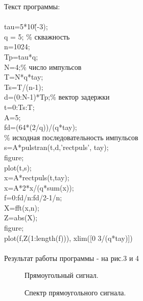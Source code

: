 \documentclass[12pt,a4paper]{report}
\begin{document}
Текст программы:\\
\\
tau=5*10\^(-3); \\
q = 5; \% скважность\\
n=1024;\\
Tp=tau*q;\\
N=4;\% число импульсов\\
T=N*q*tay; \\
Ts=T/(n-1);\\
d=(0:N-1)*Tp;\% вектор задержки \\
t=0:Ts:T; \\
A=5;\\
fd=(64*(2/q))/(q*tay);\\
\% исходная последовательность импульсов\\
s=A*pulstran(t,d,'rectpuls', tay);\\
figure;\\
plot(t,s);\\
x=A*rectpuls(t,tay);\\
x=A*2*x/(q*sum(x));\\
f=0:fd/n:fd/2-1/n;\\
X=fft(x,n);\\
Z=abs(X);\\
figure;\\
plot(f,Z(1:length(f))), xlim([0 3/(q*tay)])\\
\\
Результат работы программы - на рис.3 и 4\\
\newpage
\begin{figure}[h!]
\caption{Прямоугольный сигнал.}
\end{figure}
\begin{figure}[h!]
\caption{Спектр прямоугольного сигнала.}
\end{figure}
\end{document}
